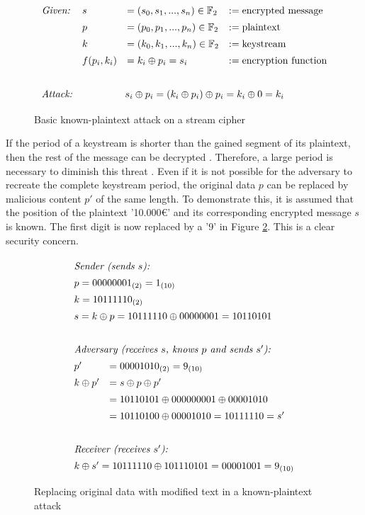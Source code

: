 \begin{figure}[htpb]
	\[\def\arraystretch{1.4}\begin{array}{llll}
		\text{\it{Given:}}& s &= (s_0, s_1, ..., s_n) \in \mathbb{F}_2 &:= \text{encrypted\ message}\\
		&p &= (p_0, p_1, ..., p_n) \in \mathbb{F}_2 &:= \text{plaintext}\\
		&k &= (k_0, k_1, ..., k_n) \in \mathbb{F}_2 &:= \text{keystream}\\
		&f(p_i, k_i) &= k_i \oplus p_i = s_i &:= \text{encryption function}\vspace{0,6cm}\\
		
		\text{\it{Attack:}}& \multicolumn{3}{c}{s_i \oplus p_i = (k_i \oplus p_i) \oplus p_i = k_i \oplus 0 = k_i}\\
	\end{array}\]
	\caption{Basic known-plaintext attack on a stream cipher}
	\label{fig:known-plaintext}
\end{figure}


If the period of a keystream is shorter than the gained segment of its plaintext, then the rest of the message can be decrypted \cite[p. 9]{Rueppel.1986}. Therefore, a large period is necessary to diminish this threat \cite[p. 83]{Stamp.2007}. Even if it is not possible for the adversary to recreate the complete keystream period, the original data $p$ can be replaced by malicious content $p'$ of the same length. To demonstrate this, it is assumed that the position of the plaintext '10.000€' and its corresponding encrypted message $s$ is known. The first digit is now replaced by a '9' in Figure \ref{fig:text-replacment}. This is a clear security concern.

\begin{figure}[htpb]
	\[\begin{array}{ll}
		\multicolumn{2}{l}{\text{\it Sender (sends $s$):}}\\
		\multicolumn{2}{l}{p = 0000 0001_{(2)} = 1_{(10)}}\\
		\multicolumn{2}{l}{k = 1011 1110_{(2)}}\\
		\multicolumn{2}{l}{s = k \oplus p = 1011 1110 \oplus 0000 0001 = 1011 0101}\\
		\\
		\multicolumn{2}{l}{\text{\it Adversary (receives $s$, knows $p$ and sends $s'$):}}\\
		p' &= 0000 1010_{(2)} = 9_{(10)}\\
		k \oplus p' &= s \oplus p \oplus p'\\
		&= 1011 0101 \oplus 0000 00001 \oplus 0000 1010  \\
		&= 1011 0100 \oplus 0000 1010 = 1011 1110 = s'\\
		\\
		\multicolumn{2}{l}{\text{\it Receiver (receives $s'$):}}\\
		\multicolumn{2}{l}{k \oplus s' = 1011 1110 \oplus 10111 0101 = 0000 1001 =  9_{(10)}}
	\end{array}\]
	\caption{Replacing original data with modified text in a known-plaintext attack }
	\label{fig:text-replacment}
\end{figure}

